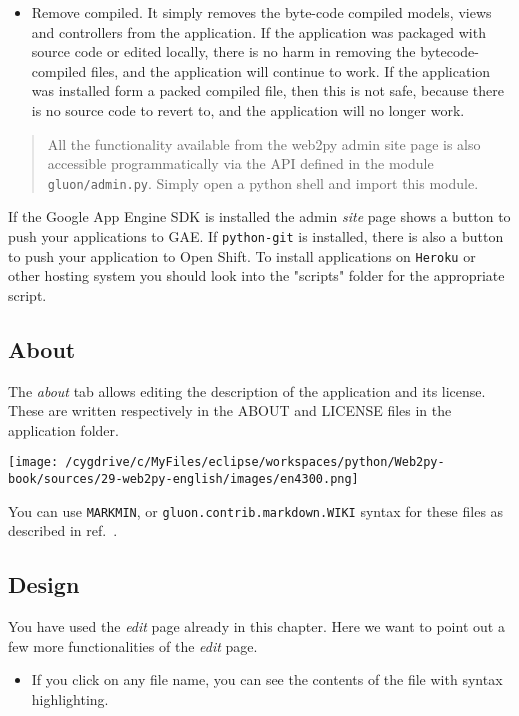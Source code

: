 \documentclass[justified,sixbynine,notoc]{tufte-book}
\def\ft{\small\tt}
\def\inxx#1{\index{#1}}
\begin{document}
\begin{fullwidth}
\begin{itemize}
\item Remove compiled. It simply removes the byte-code compiled models, views and controllers from the application. If the application was packaged with source code or edited locally, there is no harm in removing the bytecode-compiled files, and the application will continue to work. If the application was installed form a packed compiled file, then this is not safe, because there is no source code to revert to, and the application will no longer work.
\end{itemize}

\inxx{admin.py}

\begin{quote}All the functionality available from the web2py admin site page is also accessible programmatically via the API defined in the module {\ft gluon/admin.py}. Simply open a python shell and import this module.\end{quote}
If the Google App Engine SDK is installed the admin {\it site} page shows a button to push your applications to GAE. If {\ft python-git} is installed, there is also a button to push your application to Open Shift. To install applications on {\ft Heroku} or other hosting system you should look into the "scripts" folder for the appropriate script.

\goodbreak\subsection{About}

\inxx{about} \inxx{license}

The {\it about} tab allows editing the description of the application and its license. These are written respectively in the ABOUT and LICENSE files in the application folder.


\goodbreak\begin{center}\texttt{[image: /cygdrive/c/MyFiles/eclipse/workspaces/python/Web2py-book/sources/29-web2py-english/images/en4300.png]}\end{center}


You can use {\ft MARKMIN}, or {\ft gluon.contrib.markdown.WIKI} syntax for these files as described in ref.~\cite{markdown2}.

\goodbreak\subsection{Design}

\inxx{EDIT}
You have used the {\it edit} page already in this chapter. Here we want to point out a few more functionalities of the {\it edit} page.
\begin{itemize}
\item If you click on any file name, you can see the contents of the file with syntax highlighting.


\end{itemize}
\end{fullwidth}
\end{document}
